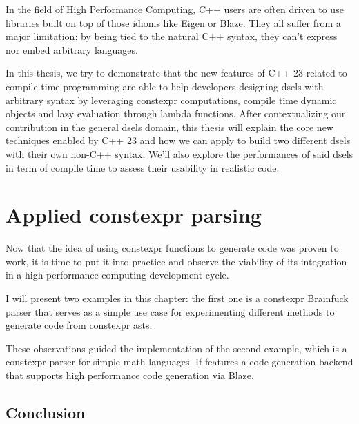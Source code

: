 \documentclass[english,12pt,a4paper]{book}
\providecommand{\cpp}{\textsc{C++}\xspace}
\begin{document}
In the field of High Performance Computing, \cpp users are often driven to use
libraries built on top of those idioms like Eigen\cite{eigen} or
Blaze\cite{blazelib,iglberger2012_2}. They all suffer from a major limitation:
by being tied to the natural \cpp syntax, they can't express nor embed arbitrary
languages.

In this thesis, we try to demonstrate that the new features of \cpp23 related to
compile time programming are able to help developers designing \glspl{dsel} with
arbitrary syntax by leveraging \gls{constexpr} computations, compile time dynamic
objects and lazy evaluation through lambda functions. After contextualizing our
contribution in the general \glspl{dsel} domain, this thesis will explain the core
new techniques enabled by \cpp23 and how we can apply to build two different
\glspl{dsel} with their own non-\cpp syntax. We'll also explore the performances of
said \glspl{dsel} in term of compile time to assess their usability in realistic code.




\chapter{
  Applied constexpr parsing
}

Now that the idea of using \gls{constexpr} functions to generate code
was proven to work, it is time to put it into practice and observe
the viability of its integration in a high performance computing
development cycle.

I will present two examples in this chapter:
the first one is a \gls{constexpr} Brainfuck parser that serves as a simple
use case for experimenting different methods to generate code from
\gls{constexpr} \glspl{ast}.

These observations guided the implementation of the second example, which is a
\gls{constexpr} parser for simple math languages. If features a code generation
backend that supports high performance code generation via Blaze.




\section{Conclusion}
\end{document}
